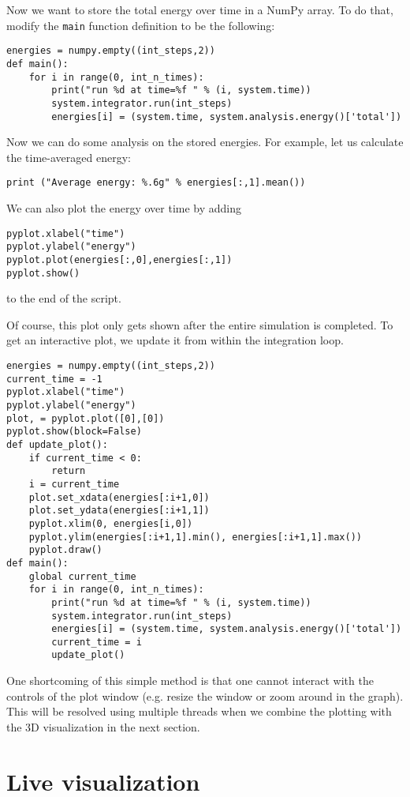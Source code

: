 \documentclass[
paper=a4,                       %
fontsize=11pt,                  %
twoside,                        %
footsepline,                    %
headsepline,                    %
headinclude=false,              %
footinclude=false,              %
pagesize,                       %
]{scrartcl}
\begin{document}
Now we want to store the total energy over time in a NumPy array.
To do that, modify the \lstinline{main} function definition to be the following:
\begin{lstlisting}
energies = numpy.empty((int_steps,2))
def main():
    for i in range(0, int_n_times):
        print("run %d at time=%f " % (i, system.time))
        system.integrator.run(int_steps)
        energies[i] = (system.time, system.analysis.energy()['total'])
\end{lstlisting}
Now we can do some analysis on the stored energies.
For example, let us calculate the time-averaged energy:
\begin{lstlisting}
print ("Average energy: %.6g" % energies[:,1].mean())
\end{lstlisting}
We can also plot the energy over time by adding
\begin{lstlisting}
pyplot.xlabel("time")
pyplot.ylabel("energy")
pyplot.plot(energies[:,0],energies[:,1])
pyplot.show()
\end{lstlisting}
to the end of the script.

Of course, this plot only gets shown after the entire simulation is completed.
To get an interactive plot, we update it from within the integration loop.
\begin{lstlisting}
energies = numpy.empty((int_steps,2))
current_time = -1
pyplot.xlabel("time")
pyplot.ylabel("energy")
plot, = pyplot.plot([0],[0])
pyplot.show(block=False)
def update_plot():
    if current_time < 0:
        return
    i = current_time
    plot.set_xdata(energies[:i+1,0])
    plot.set_ydata(energies[:i+1,1])
    pyplot.xlim(0, energies[i,0])
    pyplot.ylim(energies[:i+1,1].min(), energies[:i+1,1].max())
    pyplot.draw()
def main():
    global current_time
    for i in range(0, int_n_times):
        print("run %d at time=%f " % (i, system.time))
        system.integrator.run(int_steps)
        energies[i] = (system.time, system.analysis.energy()['total'])
        current_time = i
        update_plot()
\end{lstlisting}

One shortcoming of this simple method is that one cannot interact with the controls of the plot window (e.g. resize the window or zoom around in the graph).
This will be resolved using multiple threads when we combine the plotting with the 3D visualization in the next section.

\section{Live visualization}
\label{vis}
\end{document}
